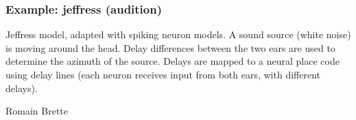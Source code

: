 \documentclass[letterpaper,10pt,english]{manual}
\begin{document}
\resetcurrentobjects
\hypertarget{--doc-examples-audition_jeffress}{}

\hypertarget{index-20}{}\subsubsection{Example: jeffress (audition)}

Jeffress model, adapted with spiking neuron models.
A sound source (white noise) is moving around the head.
Delay differences between the two ears are used to determine the azimuth of the source.
Delays are mapped to a neural place code using delay lines (each neuron receives input
from both ears, with different delays).

Romain Brette
\end{document}
